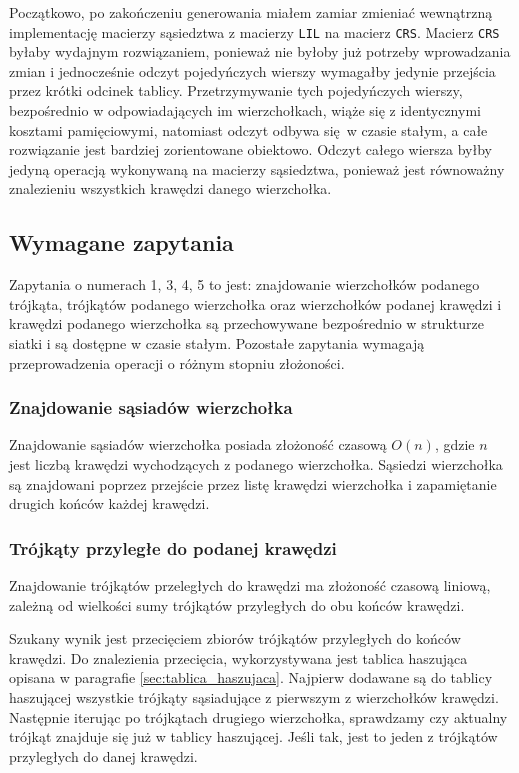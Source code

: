 \documentclass[10pt,a4paper]{article}
\newcommand{\f}[1]{\texttt{#1}}
\begin{document}
Początkowo, po zakończeniu generowania miałem zamiar zmieniać wewnątrzną
implementację macierzy sąsiedztwa z macierzy \f{LIL} na macierz \f{CRS}.
Macierz \f{CRS} byłaby wydajnym rozwiązaniem, ponieważ nie byłoby już potrzeby
wprowadzania zmian i jednocześnie odczyt pojedyńczych wierszy wymagałby
jedynie przejścia przez krótki odcinek tablicy. Przetrzymywanie tych
pojedyńczych wierszy, bezpośrednio w odpowiadających im wierzchołkach, wiąże
się z identycznymi kosztami pamięciowymi, natomiast odczyt odbywa się w czasie
stałym, a całe rozwiązanie jest bardziej zorientowane obiektowo. Odczyt całego
wiersza byłby jedyną operacją wykonywaną na macierzy sąsiedztwa, ponieważ jest
równoważny znalezieniu wszystkich krawędzi danego wierzchołka.


\subsection{Wymagane zapytania}
\label{sec:wymagane_zapytania}

Zapytania o numerach 1, 3, 4, 5 to jest: znajdowanie wierzchołków podanego
trójkąta, trójkątów podanego wierzchołka oraz wierzchołków podanej krawędzi i
krawędzi podanego wierzchołka są przechowywane bezpośrednio w strukturze
siatki i są dostępne w czasie stałym. Pozostałe zapytania wymagają
przeprowadzenia operacji o różnym stopniu złożoności.

\subsubsection{Znajdowanie sąsiadów wierzchołka}

Znajdowanie sąsiadów wierzchołka posiada złożoność czasową $O(n)$, gdzie $n$
jest liczbą krawędzi wychodzących z podanego wierzchołka. Sąsiedzi wierzchołka
są znajdowani poprzez przejście przez listę krawędzi wierzchołka i
zapamiętanie drugich końców każdej krawędzi.

\subsubsection{Trójkąty przyległe do podanej krawędzi}

Znajdowanie trójkątów przeległych do krawędzi ma złożoność czasową liniową,
zależną od wielkości sumy trójkątów przyległych do obu końców krawędzi.

Szukany wynik jest przecięciem zbiorów trójkątów przyległych do końców
krawędzi. Do znalezienia przecięcia, wykorzystywana jest tablica haszująca
opisana w paragrafie \ref{sec:tablica_haszujaca}. Najpierw dodawane są do
tablicy haszującej wszystkie trójkąty sąsiadujące z pierwszym z wierzchołków
krawędzi. Następnie iterując po trójkątach drugiego wierzchołka, sprawdzamy
czy aktualny trójkąt znajduje się już w tablicy haszującej. Jeśli tak, jest to
jeden z trójkątów przyległych do danej krawędzi.
\end{document}
